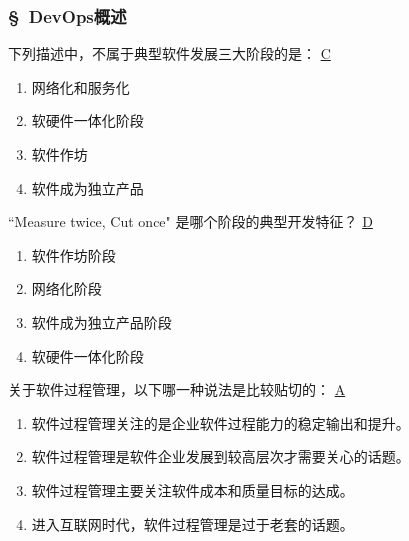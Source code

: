\subsubsection*{\S\ DevOps概述}
\setcounter{problemname}{0}

\begin{problem}
	下列描述中，不属于典型软件发展三大阶段的是：
	\uline{C}    
    \vspace{-0.8em}
    \begin{multicols}{4}
        \begin{enumerate}[label=\Alph*.]
            \item 网络化和服务化
            \item 软硬件一体化阶段
            \item 软件作坊
            \item 软件成为独立产品
        \end{enumerate}
    \end{multicols}
    \vspace{-1em}
\end{problem}



\begin{problem}
    ``Measure twice, Cut once" 是哪个阶段的典型开发特征？
    \uline{D}    
    \vspace{-0.8em}
    \begin{multicols}{2}
        \begin{enumerate}[label=\Alph*.]
            \item 软件作坊阶段
            \item 网络化阶段
            \item 软件成为独立产品阶段
            \item 软硬件一体化阶段
        \end{enumerate}
    \end{multicols}
    \vspace{-1em}
\end{problem}



\begin{problem}
    关于软件过程管理，以下哪一种说法是比较贴切的：
    \uline{A}    
        \begin{enumerate}[label=\Alph*.]
            \item 软件过程管理关注的是企业软件过程能力的稳定输出和提升。
            \item 软件过程管理是软件企业发展到较高层次才需要关心的话题。
            \item 软件过程管理主要关注软件成本和质量目标的达成。
            \item 进入互联网时代，软件过程管理是过于老套的话题。
        \end{enumerate}
\end{problem}



